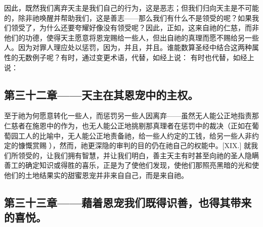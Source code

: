 因此，既然我们离弃天主是我们自己的行为，这是恶志；但我们归向天主是不可能的，除非祂唤醒并帮助我们，这是善志——那么我们有什么不是领受的呢？如果我们领受了，为什么还要夸耀好像没有领受呢？因此，正如，这来自祂的仁慈，而非他们的功德，使得天主愿意将恩宠赐给一些人，但出自祂的真理而愿不赐给另一些人。因为对罪人理应处以惩罚，因为，并且，并且。谁能数算圣经中结合这两种属性的无数例子呢？有时，通过变更术语，代替，如经上说：  有时也代替，如经上说：\par


\subsection{第三十二章——天主在其恩宠中的主权。}

至于祂为何愿意转化一些人，而惩罚另一些人因离弃——虽然无人能公正地指责那仁慈者在施恩中的作为，也无人能公正地挑剔那真理者在惩罚中的裁决（正如在葡萄园工人的比喻中，无人能公正地责备祂，给一些人约定的工钱，给另一些人非约定的慷慨赏赐 ），然而，祂更深隐的审判的目的仍在祂自己的权能中。[XIX.] 就我们所领受的，让我们拥有智慧，并让我们明白，善主天主有时甚至向祂的圣人隐瞒善工的确定知识或得胜的喜乐，正是为了使他们发现，使他们那照亮黑暗的光和使他们的土地结果实的甜蜜恩宠并非来自自己，而是来自祂。\par


\subsection{第三十三章——藉着恩宠我们既得识善，也得其带来的喜悦。}

